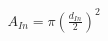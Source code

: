 \documentclass[preview]{standalone}
\begin{document}
\begin{align*}
A_{In} = \pi \left(\frac{d_{In}}{2}\right)^2
\end{align*}
\end{document}
